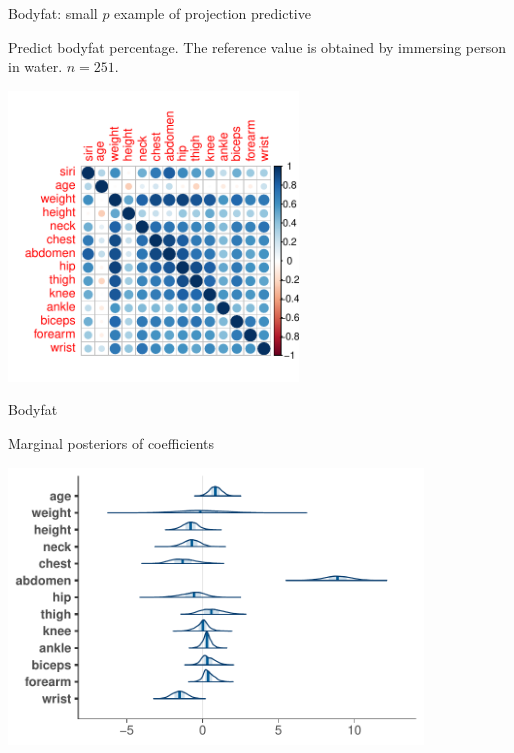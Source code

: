 \documentclass[t]{beamer}
\begin{document}
\begin{frame}{Bodyfat: small $p$ example of projection predictive}
  
  Predict bodyfat percentage. The reference value is obtained by
  immersing person in water. $n=251$.

  \pause
  \vspace{-0.7\baselineskip}
  \includegraphics[width=7.7cm]{bodyfat_corr.pdf}

\end{frame}

\begin{frame}{Bodyfat}

  Marginal posteriors of coefficients
  
  \includegraphics[width=11cm]{bodyfat_mcmc_areas.pdf}

\end{frame}
\end{document}
